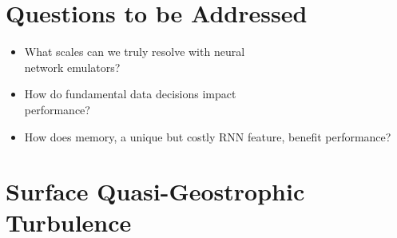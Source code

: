 \section{Questions to be Addressed}
\begin{itemize}
    \item What scales can we truly resolve with neural\\network emulators?
    \item How do fundamental data decisions impact\\performance?
    \item How does memory, a unique but costly RNN feature, benefit performance?
\end{itemize}

\section{Surface Quasi-Geostrophic Turbulence}

